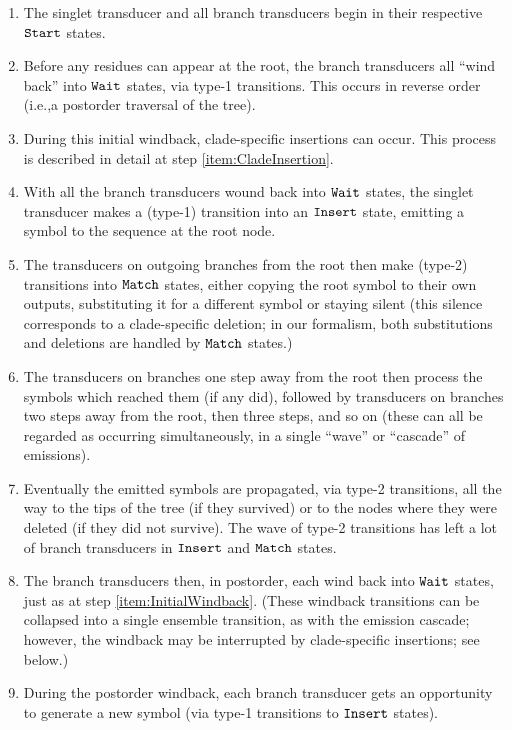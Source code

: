 \documentclass[10pt]{article}
\begin{document}
\begin{enumerate}
\item
  The singlet transducer and all branch transducers begin in their respective $\mathtt{Start}$ states.
\item \label{item:InitialWindback}
  Before any residues can appear at the root, the branch transducers all ``wind back'' into $\mathtt{Wait}$ states,
  via type-1 transitions. This occurs in reverse order (i.e.,a postorder traversal of the tree).
\item During this initial windback, clade-specific insertions can occur.
  This process is described in detail at step \ref{item:CladeInsertion}.
\item \label{item:SingletStart}
  With all the branch transducers wound back into $\mathtt{Wait}$ states,
  the singlet transducer makes a (type-1) transition into an $\mathtt{Insert}$ state, emitting a symbol to the sequence at the root node.
\item The transducers on outgoing branches from the root then make (type-2) transitions into $\mathtt{Match}$ states,
  either copying the root symbol to their own outputs,
  substituting it for a different symbol or staying silent (this silence corresponds to a clade-specific deletion;
  in our formalism, both substitutions and deletions are handled by $\mathtt{Match}$ states.)
\item The transducers on branches one step away from the root then process the symbols which reached them
  (if any did), followed by transducers on branches two steps away from the root, then three steps, and so on
  (these can all be regarded as occurring simultaneously, in a single ``wave'' or ``cascade'' of emissions).
\item \label{item:Windback}
  Eventually the emitted symbols are propagated, via type-2 transitions,
  all the way to the tips of the tree (if they survived)
  or to the nodes where they were deleted (if they did not survive).
  The wave of type-2 transitions has left a lot of branch transducers in $\mathtt{Insert}$ and $\mathtt{Match}$ states.
\item The branch transducers then, in postorder, each wind back into $\mathtt{Wait}$ states, just as at step \ref{item:InitialWindback}.
  (These windback transitions can be collapsed into a single ensemble transition, as with the emission cascade;
  however, the windback may be interrupted by clade-specific insertions; see below.)
\item \label{item:CladeInsertion}
  During the postorder windback, each branch transducer gets an opportunity to generate a new symbol (via type-1 transitions to $\mathtt{Insert}$ states).

\end{enumerate}
\end{document}
